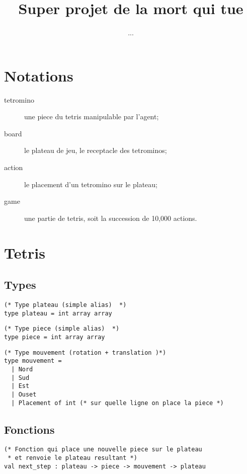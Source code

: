 \documentclass{article}
\title{Super projet de la mort qui tue}
\author{...}
\begin{document}
\maketitle
\lstset{language=Caml}

\section{Notations}
\begin{description}
  \item[tetromino] une piece du tetris manipulable par l'agent;
  \item[board] le plateau de jeu, le receptacle des tetrominos;
  \item[action] le placement d'un tetromino sur le plateau;
  \item[game] une partie de tetris, soit la succession de 10,000 actions.
\end{description}

\section{Tetris}

\subsection{Types}
\begin{lstlisting}[frame=L]
(* Type plateau (simple alias)  *)
type plateau = int array array
\end{lstlisting}

\begin{lstlisting}[frame=L]
(* Type piece (simple alias)  *)
type piece = int array array
\end{lstlisting}

\begin{lstlisting}[frame=L]
(* Type mouvement (rotation + translation )*)
type mouvement =
  | Nord
  | Sud
  | Est
  | Ouset
  | Placement of int (* sur quelle ligne on place la piece *)
\end{lstlisting}

\subsection{Fonctions}


\begin{lstlisting}[frame=L]
(* Fonction qui place une nouvelle piece sur le plateau
 * et renvoie le plateau resultant *)
val next_step : plateau -> piece -> mouvement -> plateau
\end{lstlisting}
\end{document}
